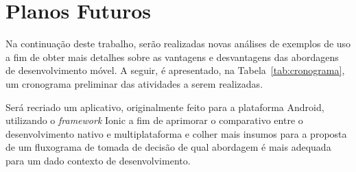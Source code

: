 \section{Planos Futuros} \label{section:planosfuturos}

Na continuação deste trabalho, serão realizadas novas análises de exemplos de uso a fim de obter mais detalhes sobre as vantagens e desvantagens das abordagens de desenvolvimento móvel.
A seguir, é apresentado, na Tabela~\ref{tab:cronograma}, um cronograma preliminar das atividades a serem realizadas.

\begin{table}[h]
\caption{Cronograma inicial para o TCC 2}
\label{tab:cronograma}
\end{table}

Será recriado um aplicativo, originalmente feito para a plataforma Android, utilizando o \textit{framework} Ionic a fim de aprimorar o comparativo entre o desenvolvimento nativo e multiplataforma e colher mais insumos
para a proposta de um fluxograma de tomada de decisão de qual abordagem é mais adequada para um dado contexto de desenvolvimento.

